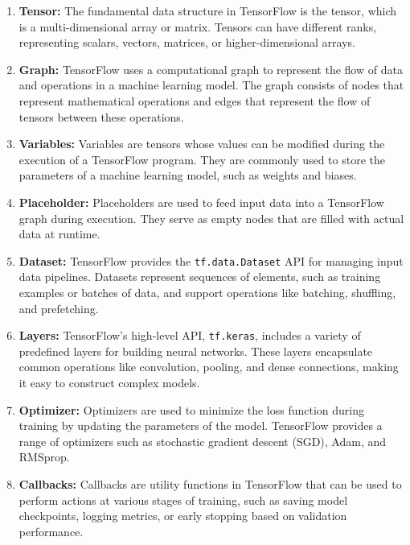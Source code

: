 \begin{enumerate}[label=\arabic*.]
	\item \textbf{Tensor:} The fundamental data structure in TensorFlow is the tensor, which is a multi-dimensional array or matrix. Tensors can have different ranks, representing scalars, vectors, matrices, or higher-dimensional arrays.
	
	\item \textbf{Graph:} TensorFlow uses a computational graph to represent the flow of data and operations in a machine learning model. The graph consists of nodes that represent mathematical operations and edges that represent the flow of tensors between these operations.
	
	\item \textbf{Variables:} Variables are tensors whose values can be modified during the execution of a TensorFlow program. They are commonly used to store the parameters of a machine learning model, such as weights and biases.
	
	\item \textbf{Placeholder:} Placeholders are used to feed input data into a TensorFlow graph during execution. They serve as empty nodes that are filled with actual data at runtime.
	
	\item \textbf{Dataset:} TensorFlow provides the \texttt{tf.data.Dataset} API for managing input data pipelines. Datasets represent sequences of elements, such as training examples or batches of data, and support operations like batching, shuffling, and prefetching.
	
	\item \textbf{Layers:} TensorFlow's high-level API, \texttt{tf.keras}, includes a variety of predefined layers for building neural networks. These layers encapsulate common operations like convolution, pooling, and dense connections, making it easy to construct complex models.
	
	\item \textbf{Optimizer:} Optimizers are used to minimize the loss function during training by updating the parameters of the model. TensorFlow provides a range of optimizers such as stochastic gradient descent (SGD), Adam, and RMSprop.
	
	\item \textbf{Callbacks:} Callbacks are utility functions in TensorFlow that can be used to perform actions at various stages of training, such as saving model checkpoints, logging metrics, or early stopping based on validation performance. 
\end{enumerate}


